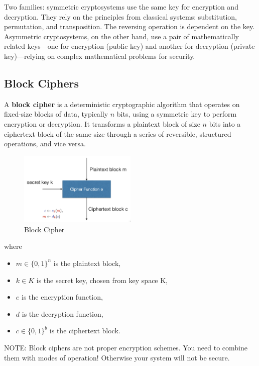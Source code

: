 Two families: symmetric cryptosystems use the same key for encryption and decryption. They rely on the principles from classical systems: substitution, permutation, and transposition. The reversing operation is dependent on the key.
Asymmetric cryptosystems, on the other hand, use a pair of mathematically related keys—one for encryption (public key) and another for decryption (private key)—relying on complex mathematical problems for security.

\subsection{Block Ciphers}
\begin{defn}
A \textbf{block cipher} is a deterministic cryptographic algorithm that operates on fixed-size blocks of data, typically \( n \) bits, using a symmetric key to perform encryption or decryption. It transforms a plaintext block of size \( n \) bits into a ciphertext block of the same size through a series of reversible, structured operations, and vice versa.

\end{defn}
\begin{figure}[h!]
    \centering
    \includegraphics[width=0.5\textwidth]{img/blockcipher.png}
    \caption{Block Cipher}
    \label{fig:block_cipher}
\end{figure}

where
\begin{itemize}
    \item $m \in \{0,1\}^n$ is the plaintext block,
    \item $k \in K$ is the secret key, chosen from key space K,
    \item $e$ is the encryption function,
    \item $d$ is the decryption function,
    \item $c \in \{0,1\}^b$ is the ciphertext block.
\end{itemize}

NOTE: Block ciphers are not proper encryption schemes. You need to combine them with modes of operation! Otherwise your system will not be secure.

